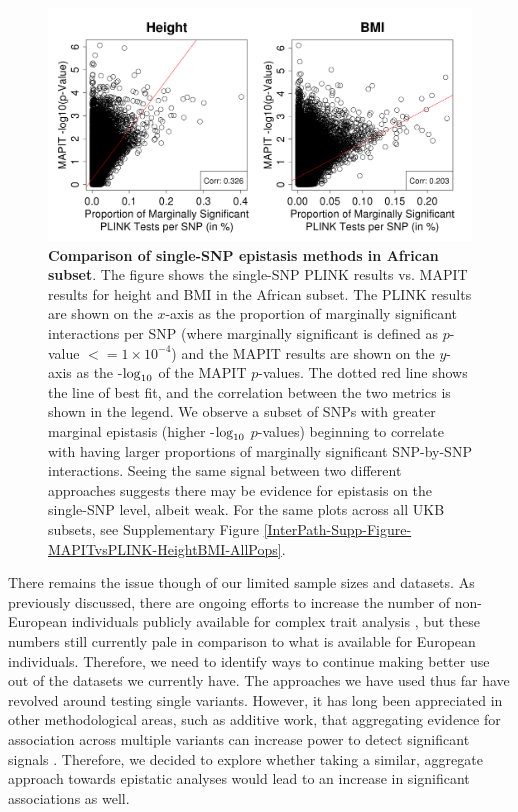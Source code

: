 \documentclass[12pt,a4paper]{article}
\def\log{{\rm log}}
\begin{document}
\begin{figure}[htb]
\centering
\includegraphics[scale=.45]{Images/Main/InterPath_Main_Figure_PLINKvsMAPIT_vs3_African_HeightBMI.png}
\caption[TBD]{\textbf{Comparison of single-SNP epistasis methods in African subset}. The figure shows the single-SNP PLINK results vs. MAPIT results for height and BMI in the African subset. The PLINK results are shown on the $x$-axis as the proportion of marginally significant interactions per SNP (where marginally significant is defined as $p$-value $<= 1\times10^{-4}$) and the MAPIT results are shown on the $y$-axis as the -$\log_{10}$ of the MAPIT $p$-values. The dotted red line shows the line of best fit, and the correlation between the two metrics is shown in the legend. We observe a subset of SNPs with greater marginal epistasis (higher -$\log_{10}$ $p$-values) beginning to correlate with having larger proportions of marginally significant SNP-by-SNP interactions. Seeing the same signal between two different approaches suggests there may be evidence for epistasis on the single-SNP level, albeit weak. For the same plots across all UKB subsets, see Supplementary Figure \ref{InterPath-Supp-Figure-MAPITvsPLINK-HeightBMI-AllPops}.}
\label{InterPath-Main-Figure-PLINKvsMAPIT-HeightBMI-African}
\end{figure}

There remains the issue though of our limited sample sizes and datasets. As previously discussed, there are ongoing efforts to increase the number of non-European individuals publicly available for complex trait analysis \citep{Matise2011,Kowalski2019}, but these numbers still currently pale in comparison to what is available for European individuals. Therefore, we need to identify ways to continue making better use out of the datasets we currently have. The approaches we have used thus far have revolved around testing single variants. However, it has long been appreciated in other methodological areas, such as additive work, that aggregating evidence for association across multiple variants can increase power to detect significant signals \citep{}. Therefore, we decided to explore whether taking a similar, aggregate approach towards epistatic analyses would lead to an increase in significant associations as well. 
\end{document}
